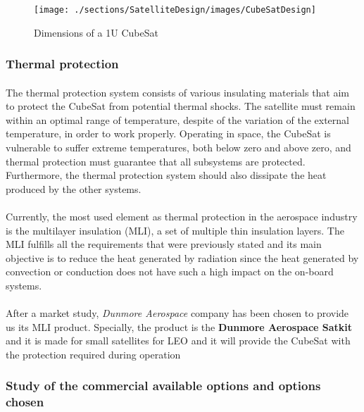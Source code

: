 \begin{figure}[h!]
\texttt{[image: ./sections/SatelliteDesign/images/CubeSatDesign]}
\centering
\caption{Dimensions of a 1U CubeSat}
\cite{cubesatdimensions}
\end{figure}

\subsubsection{Thermal protection}
\paragraph{}The thermal protection system consists of various insulating materials that aim to protect the CubeSat from potential thermal shocks. The satellite must remain within an optimal range of temperature, despite of the variation of the external temperature, in order to work properly. Operating in space, the CubeSat is vulnerable to suffer extreme temperatures, both below zero and above zero, and thermal protection must guarantee that all subsystems are protected. Furthermore, the thermal protection system should also dissipate the heat produced by the other systems.

\paragraph{} Currently, the most used element as thermal protection in the aerospace industry is the multilayer insulation (MLI), a set of multiple thin insulation layers. The MLI fulfills all the requirements that were previously stated and its main objective is to reduce the heat generated by radiation since the heat generated by convection or conduction does not have such a high impact on the on-board systems.

\paragraph{} 
After a market study, \textit{Dunmore Aerospace} company has been chosen to provide us its MLI product. Specially, the product is the \textbf{Dunmore Aerospace Satkit} and it is made for small satellites for LEO and it will provide the CubeSat with the protection required during operation

\subsubsection{Study of the commercial available options and options chosen}
